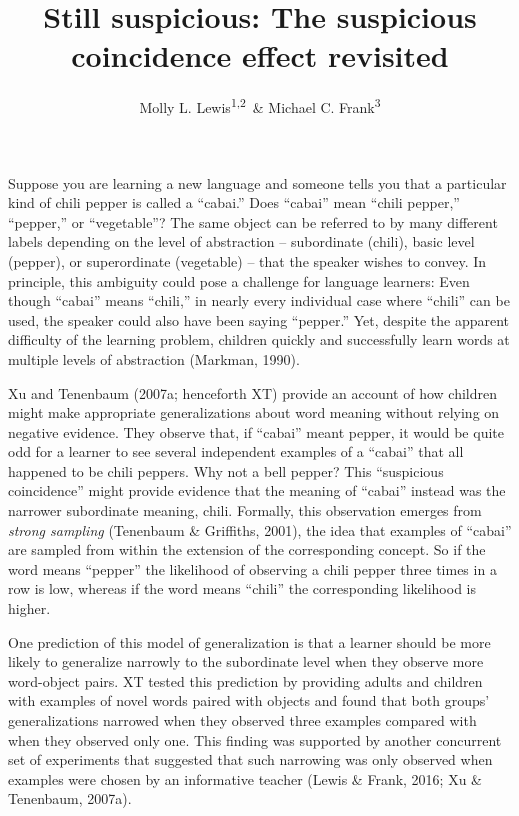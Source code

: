 \documentclass[english,floatsintext,man]{apa6}
\title{Still suspicious: The suspicious coincidence effect revisited}
\author{Molly L. Lewis\textsuperscript{1,2}~\& Michael C. Frank\textsuperscript{3}}
\affiliation{
    \vspace{0.5cm}
          \textsuperscript{1} Computation Institute, University of Chicago\\
          \textsuperscript{2} Department of Psychology, University of Wisconsin, Madison\\
          \textsuperscript{3} Department of Psychology, Stanford University  }
\theoremstyle{definition}
\theoremstyle{definition}
\theoremstyle{remark}
\begin{document}
\maketitle

\setcounter{secnumdepth}{0}



Suppose you are learning a new language and someone tells you that a
particular kind of chili pepper is called a \enquote{cabai.} Does
\enquote{cabai} mean \enquote{chili pepper,} \enquote{pepper,} or
\enquote{vegetable}? The same object can be referred to by many
different labels depending on the level of abstraction -- subordinate
(chili), basic level (pepper), or superordinate (vegetable) -- that the
speaker wishes to convey. In principle, this ambiguity could pose a
challenge for language learners: Even though \enquote{cabai} means
\enquote{chili,} in nearly every individual case where \enquote{chili}
can be used, the speaker could also have been saying \enquote{pepper.}
Yet, despite the apparent difficulty of the learning problem, children
quickly and successfully learn words at multiple levels of abstraction
(Markman, 1990).

Xu and Tenenbaum (2007a; henceforth XT) provide an account of how
children might make appropriate generalizations about word meaning
without relying on negative evidence. They observe that, if
\enquote{cabai} meant pepper, it would be quite odd for a learner to see
several independent examples of a \enquote{cabai} that all happened to
be chili peppers. Why not a bell pepper? This \enquote{suspicious
coincidence} might provide evidence that the meaning of \enquote{cabai}
instead was the narrower subordinate meaning, chili. Formally, this
observation emerges from \emph{strong sampling} (Tenenbaum \& Griffiths,
2001), the idea that examples of \enquote{cabai} are sampled from within
the extension of the corresponding concept. So if the word means
\enquote{pepper} the likelihood of observing a chili pepper three times
in a row is low, whereas if the word means \enquote{chili} the
corresponding likelihood is higher.

One prediction of this model of generalization is that a learner should
be more likely to generalize narrowly to the subordinate level when they
observe more word-object pairs. XT tested this prediction by providing
adults and children with examples of novel words paired with objects and
found that both groups' generalizations narrowed when they observed
three examples compared with when they observed only one. This finding
was supported by another concurrent set of experiments that suggested
that such narrowing was only observed when examples were chosen by an
informative teacher (Lewis \& Frank, 2016; Xu \& Tenenbaum, 2007a).
\end{document}
